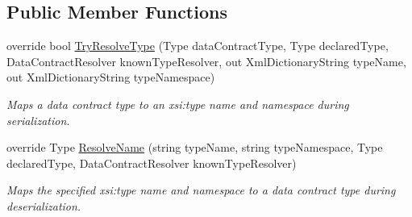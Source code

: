 \subsection*{Public Member Functions}
\begin{DoxyCompactItemize}
\item 
override bool \hyperlink{classCqrs_1_1Services_1_1BasicServiceParameterResolver_adbc4b10f8931db30768d7ca84bdb0260_adbc4b10f8931db30768d7ca84bdb0260}{Try\+Resolve\+Type} (Type data\+Contract\+Type, Type declared\+Type, Data\+Contract\+Resolver known\+Type\+Resolver, out Xml\+Dictionary\+String type\+Name, out Xml\+Dictionary\+String type\+Namespace)
\begin{DoxyCompactList}\small\item\em Maps a data contract type to an xsi\+:type name and namespace during serialization. \end{DoxyCompactList}\item 
override Type \hyperlink{classCqrs_1_1Services_1_1BasicServiceParameterResolver_a8c598f2f49a83190c315afc88e5630d5_a8c598f2f49a83190c315afc88e5630d5}{Resolve\+Name} (string type\+Name, string type\+Namespace, Type declared\+Type, Data\+Contract\+Resolver known\+Type\+Resolver)
\begin{DoxyCompactList}\small\item\em Maps the specified xsi\+:type name and namespace to a data contract type during deserialization. \end{DoxyCompactList}\end{DoxyCompactItemize}
